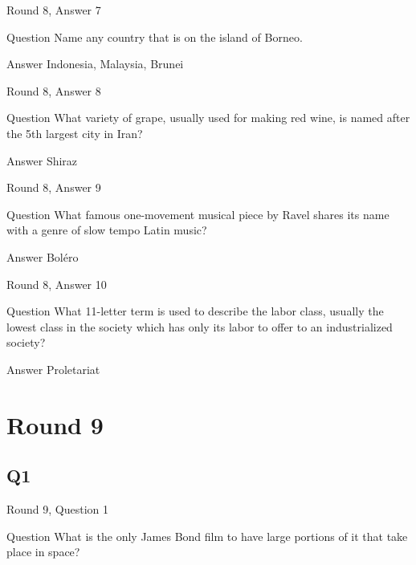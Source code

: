 \documentclass[11pt]{beamer}
\begin{document}
\begin{frame}[t]{Round 8, Answer 7}
\vspace{2em}
\begin{block}{Question}
Name any country that is on the island of Borneo.
\end{block}
\pause{}
\begin{block}{Answer}
Indonesia, Malaysia, Brunei
\end{block}
\end{frame}
    

\begin{frame}[t]{Round 8, Answer 8}
\vspace{2em}
\begin{block}{Question}
What variety of grape, usually used for making red wine, is named after the 5th largest city in Iran\@?
\end{block}
\pause{}
\begin{block}{Answer}
Shiraz
\end{block}
\end{frame}
    

\begin{frame}[t]{Round 8, Answer 9}
\vspace{2em}
\begin{block}{Question}
What famous one-movement musical piece by Ravel shares its name with a genre of slow tempo Latin music\@?
\end{block}
\pause{}
\begin{block}{Answer}
Boléro
\end{block}
\end{frame}
    

\begin{frame}[t]{Round 8, Answer 10}
\vspace{2em}
\begin{block}{Question}
What 11-letter term is used to describe the labor class, usually the lowest class in the society which has only its labor to offer to an industrialized society\@?
\end{block}
\pause{}
\begin{block}{Answer}
Proletariat
\end{block}
\end{frame}
    

\section{Round 9}
    

\subsection*{Q1}
\begin{frame}[t]{Round 9, Question 1}
\vspace{2em}
\begin{block}{Question}
What is the only James Bond film to have large portions of it that take place in space\@?
\end{block}
\end{frame}
    
\end{document}
